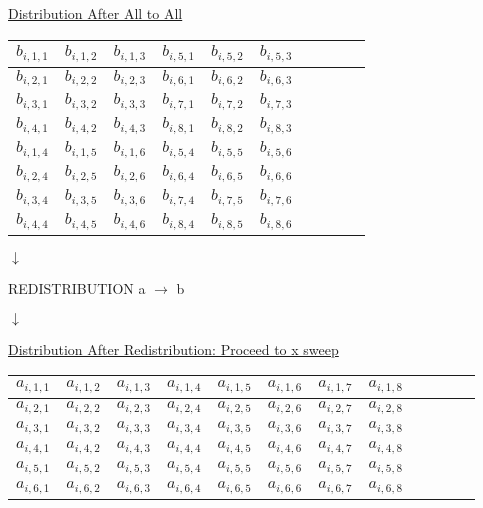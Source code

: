 \documentclass[11pt,doublespace]{article}
\begin{document}
\centerline{\underline{Distribution After All to All}}
\medskip
\begin{center}
\begin{tabular}{|c|c|c||c|c|c|c|c|c|c|} 
\hline
$b_{i,1,1}$ & $b_{i,1,2}$ & $b_{i,1,3}$ & $b_{i,5,1}$ & $b_{i,5,2}$ & $b_{i,5,3}$\\
\hline
$b_{i,2,1}$ & $b_{i,2,2}$ & $b_{i,2,3}$ & $b_{i,6,1}$ & $b_{i,6,2}$ & $b_{i,6,3}$\\
\hline
$b_{i,3,1}$ & $b_{i,3,2}$ & $b_{i,3,3}$ & $b_{i,7,1}$ & $b_{i,7,2}$ & $b_{i,7,3}$\\
\hline
$b_{i,4,1}$ & $b_{i,4,2}$ & $b_{i,4,3}$ & $b_{i,8,1}$ & $b_{i,8,2}$ & $b_{i,8,3}$\\
\hline\hline\hline
$b_{i,1,4}$ & $b_{i,1,5}$ & $b_{i,1,6}$ & $b_{i,5,4}$ & $b_{i,5,5}$ & $b_{i,5,6}$\\
\hline
$b_{i,2,4}$ & $b_{i,2,5}$ & $b_{i,2,6}$ & $b_{i,6,4}$ & $b_{i,6,5}$ & $b_{i,6,6}$\\
\hline
$b_{i,3,4}$ & $b_{i,3,5}$ & $b_{i,3,6}$ & $b_{i,7,4}$ & $b_{i,7,5}$ & $b_{i,7,6}$\\
\hline
$b_{i,4,4}$ & $b_{i,4,5}$ & $b_{i,4,6}$ & $b_{i,8,4}$ & $b_{i,8,5}$ & $b_{i,8,6}$\\
\hline
\end{tabular}
\end{center}

\begin{center}
$\downarrow$
\end{center}

\begin{center}
{\Large REDISTRIBUTION a $\rightarrow$ b }
\end{center}

\begin{center}
$\downarrow$
\end{center}

\newpage

\centerline{\underline{Distribution After Redistribution: Proceed to x sweep}}
\medskip
\begin{center}
\begin{tabular}{|c|c|c|c||c|c|c|c|c|c|c|c|} 
\hline
$ a_{i,1,1}$ &  $a_{i,1,2}$ & $a_{i,1,3}$ & $a_{i,1,4}$ & $a_{i,1,5}$ & $a_{i,1,6}$ & $a_{i,1,7}$ & $a_{i,1,8}$ \\
\hline
$ a_{i,2,1}$ &  $a_{i,2,2}$ & $a_{i,2,3}$ & $a_{i,2,4}$ & $a_{i,2,5}$ & $a_{i,2,6}$ & $a_{i,2,7}$ & $a_{i,2,8}$ \\
\hline
$ a_{i,3,1}$ &  $a_{i,3,2}$ & $a_{i,3,3}$ & $a_{i,3,4}$ & $a_{i,3,5}$ & $a_{i,3,6}$ & $a_{i,3,7}$ & $a_{i,3,8}$ \\
\hline\hline\hline
$ a_{i,4,1}$ &  $a_{i,4,2}$ & $a_{i,4,3}$ & $a_{i,4,4}$ & $a_{i,4,5}$ & $a_{i,4,6}$ & $a_{i,4,7}$ & $a_{i,4,8}$ \\
\hline
$ a_{i,5,1}$ &  $a_{i,5,2}$ & $a_{i,5,3}$ & $a_{i,5,4}$ & $a_{i,5,5}$ & $a_{i,5,6}$ & $a_{i,5,7}$ & $a_{i,5,8}$ \\
\hline
$ a_{i,6,1}$ &  $a_{i,6,2}$ & $a_{i,6,3}$ & $a_{i,6,4}$ & $a_{i,6,5}$ & $a_{i,6,6}$ & $a_{i,6,7}$ & $a_{i,6,8}$ \\
\hline
\end{tabular}
\end{center}
\end{document}
